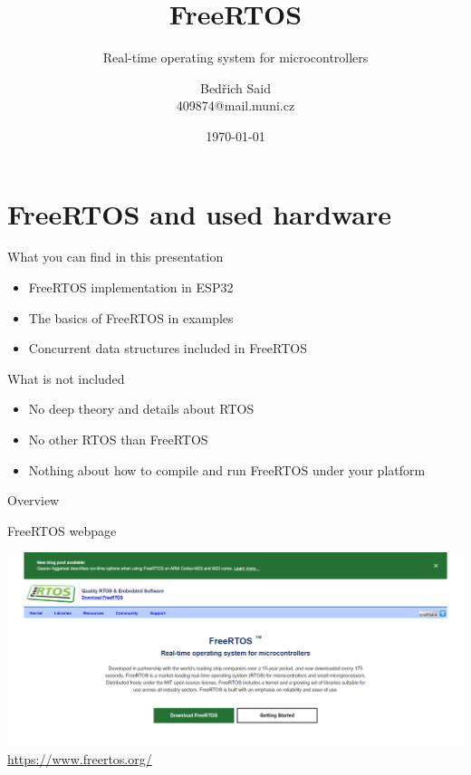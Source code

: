\documentclass[
aspectratio=169,
]{beamer}
\begin{document}
\title[FreeRTOS]{FreeRTOS}
\subtitle[Real-time operating system for microcontrollers]{Real-time operating system for microcontrollers}
\author[B.\,Said]{Bed\v{r}ich Said \\ 409874@mail.muni.cz}
\date{\today}
\subject{Presentation Subject}

\begin{frame}[plain]
\maketitle
\end{frame}

\section[FreeRTOS and used hardware]{FreeRTOS and used hardware}

\begin{frame}
	\begin{block}{What you can find in this presentation}
		\begin{itemize}
			\item FreeRTOS implementation in ESP32
			\item The basics of FreeRTOS in examples
			\item Concurrent data structures included in FreeRTOS
		\end{itemize}
	\end{block}
	\begin{exampleblock}{What is not included}
		\begin{itemize}
			\item No deep theory and details about RTOS
			\item No other RTOS than FreeRTOS
			\item Nothing about how to compile and run FreeRTOS under your platform
		\end{itemize}
	\end{exampleblock}
\end{frame}

\begin{frame}{Overview}
	\tableofcontents[currentsection]
\end{frame}

\begin{frame}{FreeRTOS webpage}
	\begin{center}
		\includegraphics[width=\textwidth]{img/screencapture-freertos-org.png}\\
		\url{https://www.freertos.org/}
	\end{center}
\end{frame}
\end{document}
